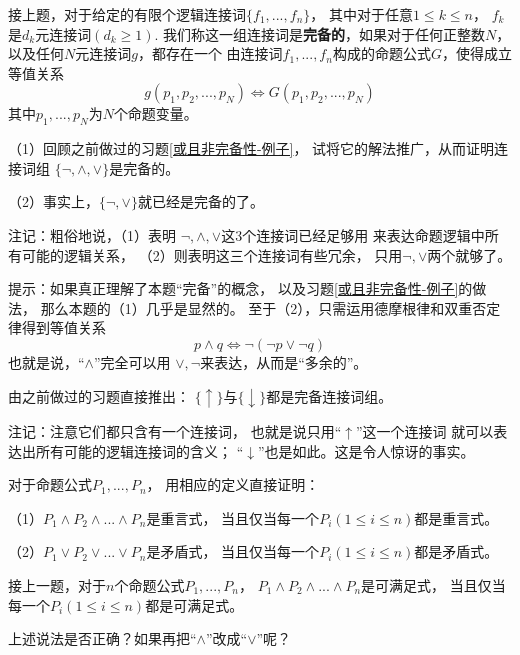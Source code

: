 \begin{prob}[完备连接词组]
接上题，对于给定的有限个逻辑连接词$\{f_1,...,f_n\}$，
其中对于任意$1\leq k\leq n$，
$f_k$是$d_k$元连接词$(d_k\geq 1)$.
我们称这一组连接词是\textbf{完备的}，如果对于任何正整数$N$，
以及任何$N$元连接词$g$，都存在一个
由连接词$f_1,...,f_n$构成的命题公式$G$，使得成立等值关系
$$g(p_1,p_2,...,p_N)\Leftrightarrow G(p_1,p_2,...,p_N)$$
其中$p_1,...,p_N$为$N$个命题变量。

（1）回顾之前做过的习题\ref{或且非完备性-例子}，
试将它的解法推广，从而证明连接词组
$\{\neg,\wedge,\vee\}$是完备的。

（2）事实上，$\{\neg,\vee\}$就已经是完备的了。
\end{prob}

注记：粗俗地说，（1）表明
$\neg,\wedge,\vee$这3个连接词已经足够用
来表达命题逻辑中所有可能的逻辑关系，
（2）则表明这三个连接词有些冗余，
只用$\neg,\vee$两个就够了。\vs

提示：如果真正理解了本题“完备”的概念，
以及习题\ref{或且非完备性-例子}的做法，
那么本题的（1）几乎是显然的。
至于（2），只需运用德摩根律和双重否定律得到等值关系
$$p\wedge q\Leftrightarrow\neg(\neg p\vee\neg q)$$
也就是说，“$\wedge$”完全可以用
$\vee,\neg$来表达，从而是“多余的”。\vs

\begin{prob}
由之前做过的习题直接推出：
$\{\uparrow\}$与$\{\downarrow\}$都是完备连接词组。
\end{prob}

注记：注意它们都只含有一个连接词，
也就是说只用“$\uparrow$”这一个连接词
就可以表达出所有可能的逻辑连接词的含义；
“$\downarrow$”也是如此。这是令人惊讶的事实。\vs

\begin{prob}对于命题公式$P_1,...,P_n$，
用相应的定义直接证明：

（1）$P_1\wedge P_2\wedge...\wedge P_n$是重言式，
当且仅当每一个$P_i(1\leq i\leq n)$都是重言式。

（2）$P_1\vee P_2\vee...\vee P_n$是矛盾式，
当且仅当每一个$P_i(1\leq i\leq n)$都是矛盾式。
\end{prob}\vs

\begin{prob}接上一题，对于$n$个命题公式$P_1,...,P_n$，
$P_1\wedge P_2\wedge...\wedge P_n$是可满足式，
当且仅当每一个$P_i(1\leq i\leq n)$都是可满足式。

上述说法是否正确？如果再把“$\wedge$”改成“$\vee$”呢？
\end{prob}\vs

